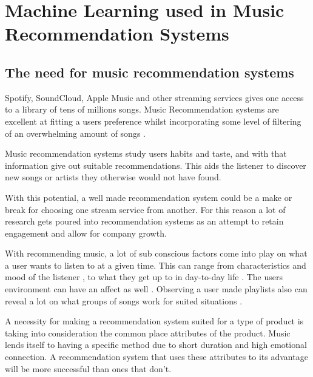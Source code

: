 
\graphicspath{{Chapter2/}}

\chapter{Machine Learning used in Music Recommendation Systems}



\section{The need for music recommendation systems}
Spotify, SoundCloud, Apple Music and other streaming services gives one access to a library of tens of millions songs. Music Recommendation systems are excellent at fitting a users preference whilst incorporating some level of filtering of an overwhelming amount of songs \citep{bollen_understanding_2010}. 

Music recommendation systems study users habits and taste, and with that information give out suitable recommendations. This aids the listener to discover new songs or artists they otherwise would not have found.

With this potential, a well made recommendation system could be a make or break for choosing one stream service from another. For this reason a lot of research gets poured into recommendation systems as an attempt to retain engagement and allow for company growth. 

 With recommending music, a lot of sub conscious factors come into play on what a user wants to listen to at a given time. This can range from characteristics and mood of the listener \citep{ferwerda_personality_nodate}  \citep{rentfrow_re_2003}, to what they get up to in day-to-day life \citep{gillhofer_iron_2015} \citep{wang_context-aware_2012}.  The users environment can have an affect as well \citep{kaminskas_location-aware_2013}. Observing a user made playlists also can reveal a lot on what groups of songs work for suited situations \citep{zheleva_statistical_2010} \citep{mcfee_hypergraph_2012}.
 
 A necessity for making a recommendation system suited for a type of product is taking into consideration the common place attributes of the product. Music lends itself to having a specific method due to short duration and high emotional connection. A recommendation system that uses these attributes to its advantage will be more successful than ones that don't.

